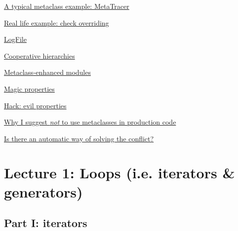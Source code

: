 \documentclass[10pt,a4paper,english]{article}
\begin{document}
\begin{list}{}{}
\begin{list}{}{}
\begin{list}{}{}
\item {} \href{\#a-typical-metaclass-example-metatracer}{A typical metaclass example: MetaTracer}

\item {} \href{\#real-life-example-check-overriding}{Real life example: check overriding}

\item {} \href{\#logfile}{LogFile}

\item {} \href{\#cooperative-hierarchies}{Cooperative hierarchies}

\item {} \href{\#metaclass-enhanced-modules}{Metaclass-enhanced modules}

\item {} \href{\#magic-properties}{Magic properties}

\item {} \href{\#hack-evil-properties}{Hack: evil properties}

\item {} \href{\#why-i-suggest-not-to-use-metaclasses-in-production-code}{Why I suggest \emph{not} to use metaclasses in production code}

\item {} \href{\#is-there-an-automatic-way-of-solving-the-conflict}{Is there an automatic way of solving the conflict?}

\end{list}

\end{list}

\end{list}




\hypertarget{lecture-1-loops-i-e-iterators-generators}{}
\section*{Lecture 1: Loops (i.e. iterators {\&} generators)}



\hypertarget{part-i-iterators}{}
\subsection*{Part I: iterators}
\end{document}
